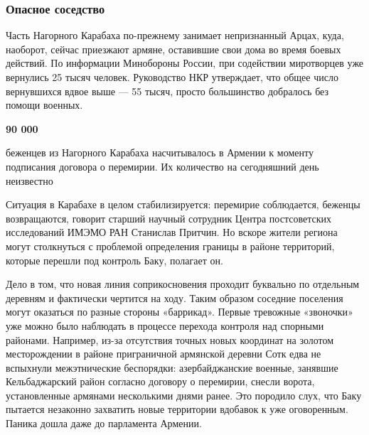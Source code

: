  
 
 
 
 
\subsubsection{Опасное соседство}

Часть Нагорного Карабаха по-прежнему занимает непризнанный Арцах, куда,
наоборот, сейчас приезжают армяне, оставившие свои дома во время боевых
действий. По информации Минобороны России, при содействии миротворцев уже
вернулись 25 тысяч человек. Руководство НКР утверждает, что общее число
вернувшихся вдвое выше — 55 тысяч, просто большинство добралось без помощи
военных.

\begin{leftbar}
	\bfseries
{\centering\color{orange}\Huge 90 000}\par
беженцев из Нагорного Карабаха насчитывалось в Армении к моменту подписания
договора о перемирии. Их количество на сегодняшний день неизвестно
\end{leftbar}

Ситуация в Карабахе в целом стабилизируется: перемирие соблюдается, беженцы
возвращаются, говорит старший научный сотрудник Центра постсоветских
исследований ИМЭМО РАН Станислав Притчин. Но вскоре жители региона могут
столкнуться с проблемой определения границы в районе территорий, которые
перешли под контроль Баку, полагает он.

Дело в том, что новая линия соприкосновения проходит буквально по отдельным
деревням и фактически чертится на ходу. Таким образом соседние поселения могут
оказаться по разные стороны «баррикад». Первые тревожные «звоночки» уже можно
было наблюдать в процессе перехода контроля над спорными районами. Например,
из-за отсутствия точных новых координат на золотом месторождении в районе
приграничной армянской деревни Сотк едва не вспыхнули межэтнические беспорядки:
азербайджанские военные, занявшие Кельбаджарский район согласно договору о
перемирии, снесли ворота, установленные армянами несколькими днями ранее. Это
породило слух, что Баку пытается незаконно захватить новые территории вдобавок
к уже оговоренным. Паника дошла даже до парламента Армении.

